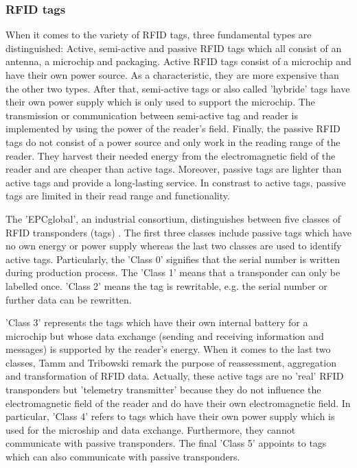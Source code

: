 \subsubsection{RFID tags} \label{tag}

When it comes to the variety of RFID tags, three fundamental types are distinguished: Active, semi-active and passive RFID tags \cite{henrici} which all consist of an antenna, a microchip and packaging. Active RFID tags consist of a microchip and have their own power source. As a characteristic, they are more expensive than the other two types. After that, semi-active tags or also called 'hybride' tags have their own power supply which is only used to support the microchip. The transmission or communication between semi-active tag and reader is implemented by using the power of the reader's field. Finally, the passive RFID tags do not consist of a power source and only work in the reading range of the reader. They harvest their needed energy from the electromagnetic field of the reader and are cheaper than active tags. Moreover, passive tags are lighter than active tags and provide a long-lasting service. In constrast to active tags, passive tags are limited in their read range and functionality.

The 'EPCglobal', an industrial consortium, distinguishes between five classes of RFID transponders (tags) \label{classes} \cite[p.15 ff.]{fokus}. The first three classes include passive tags which have no own energy or power supply whereas the last two classes are used to identify active tags. Particularly, the 'Class 0' signifies that the serial number is written during production process. The 'Class 1' means that a transponder can only be labelled once. 'Class 2' means the tag is rewritable, e.g. the serial number or further data can be rewritten. 

'Class 3' represents the tags which have their own internal battery for a microchip but whose data exchange (sending and receiving information and messages) is supported by the reader's energy. When it comes to the last two classes, Tamm and Tribowski remark the purpose of reassessment, aggregation and transformation of RFID data. Actually, these active tags are no 'real' RFID transponders but 'telemetry transmitter' because they do not influence the electromagnetic field of the reader and do have their own electromagnetic field. In particular, 'Class 4' refers to tags which have their own power supply which is used for the microship and data exchange. Furthermore, they cannot communicate with passive transponders. The final 'Class 5' appoints to tags which can also communicate with passive transponders. 

